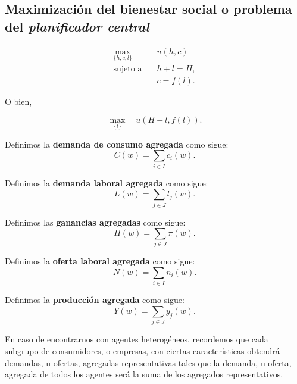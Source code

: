 \documentclass[8pt,a4paper]{extarticle}
\begin{document}
\begin{multicols}{3}
\newpage

\subsection{Maximización del bienestar social o problema del \emph{planificador central}}

\begin{equation*}
	\begin{aligned}
		\max_{\{h, c, l\}} \quad   & u(h, c) \\
		\text{sujeto a} \quad      & h + l = H, \\
							       & c = f(l).
	\end{aligned}
\end{equation*}

O bien,

\[
	\max_{\{l\}} \quad u(H - l, f(l))
.\] 

\begin{boxdef}
	Definimos la \textbf{demanda de consumo agregada} como sigue:
	\[
		C(w) = \sum_{i \in I} c_i(w)
	.\] 
\end{boxdef}

\begin{boxdef}
	Definimos la \textbf{demanda laboral agregada} como sigue:
	\[
		L(w) = \sum_{j \in J} l_j(w)
	.\] 
\end{boxdef}

\begin{boxdef}
	Definimos las \textbf{ganancias agregadas} como sigue:
	\[
		\Pi(w) = \sum_{j \in J} \pi(w)
	.\] 
\end{boxdef}

\begin{boxdef}
	Definimos la \textbf{oferta laboral agregada} como sigue:
	\[
		N(w) = \sum_{i \in I} n_i(w)
	.\] 
\end{boxdef}

\begin{boxdef}
	Definimos la \textbf{producción agregada} como sigue:
	\[
		Y(w) = \sum_{j \in J} y_j(w)
	.\] 
\end{boxdef}

En caso de encontrarnos con agentes heterogéneos, recordemos que cada subgrupo de consumidores, o empresas, con ciertas características obtendrá demandas, u ofertas, agregadas representativas tales que la demanda, u oferta, agregada de todos los agentes será la suma de los agregados representativos.


\end{multicols}
\end{document}
